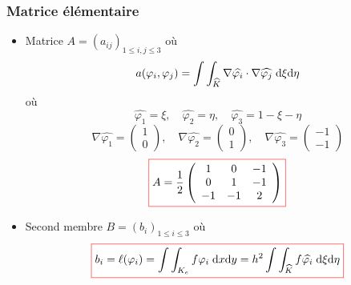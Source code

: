 \documentclass{beamer}
\def \de {{\rm d}}
\newcommand{\myredbox}[1]{\fcolorbox{red}{white}{$\displaystyle#1$}}
\begin{document}
\begin{frame}
\frametitle{Matrice élémentaire}
\begin{itemize}
\item Matrice $A=(a_{ij})_{1\leq i,j \leq 3}$ où 
\[a(\varphi_i,\varphi_j)=\displaystyle \int\int_{\widehat{K}}\nabla \widehat{\varphi_i} \cdot \nabla \widehat{\varphi_j}\;\de\xi\de\eta\]
où
\[\widehat{\varphi_1}=\xi,\quad \widehat{\varphi_2}=\eta,\quad \widehat{\varphi_3}=1-\xi-\eta\] 
\[\nabla\widehat{\varphi_1}=\left(\begin{array}{c} 1\\0\end{array}\right)
 ,\quad \nabla\widehat{\varphi_2}=\left(\begin{array}{c} 0\\1\end{array}\right),\quad \nabla\widehat{\varphi_3}=\left(\begin{array}{c} -1\\-1\end{array}\right)\] 
 \[\myredbox{A=\frac 12 \left(\begin{array}{ccc} 1&0&-1\\0&1&-1\\-1&-1&2\end{array}\right)}\]
 \item Second membre $B=(b_i)_{1\leq i\leq 3}$ où
 \[\myredbox{b_{i} = \ell(\varphi_i)=\displaystyle \int\int_{K_e} f \varphi_i \;\de x\de y =h^2\displaystyle \int\int_{\widehat{K}} f \widehat{\varphi_i} \;\de\xi\de\eta}\] 
\end{itemize}
\end{frame}


\end{document}
